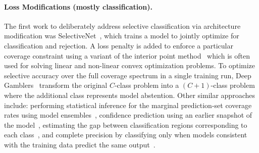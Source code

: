 \paragraph{Loss Modifications (mostly classification).} 
The first work to deliberately address selective classification via architecture modification was SelectiveNet~\citep{geifman2019selectivenet}, which trains a model to jointly optimize for classification and rejection. A loss penalty is added to enforce a particular coverage constraint using a variant of the interior point method~\cite{potra2000interior} which is often used for solving linear and non-linear convex optimization problems. To optimize selective accuracy over the full coverage spectrum in a single training run, Deep Gamblers~\citep{liu2019deep} transform the original $C$-class problem into a $(C + 1)$-class problem where the additional class represents model abstention.  
Other similar approaches include: performing statistical inference for the marginal prediction-set coverage rates using model ensembles~\citep{feng2021selective}, confidence prediction using an earlier snapshot of the model~\citep{geifman2018bias}, estimating the gap between classification regions corresponding to each class~\citep{gangrade2021selective}, and complete precision by classifying only when models consistent with the training data predict the same output~\citep{khani2016unanimous}. %


